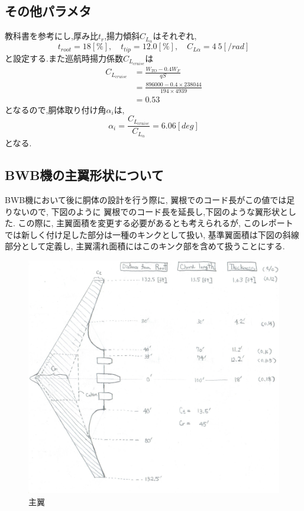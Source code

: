 \documentclass[class=article, crop=false, dvipdfmx, fleqn]{standalone}
\begin{document}
\subsection{その他パラメタ}
教科書を参考にし,厚み比$t_r$,揚力傾斜$C_{L_{\alpha}}$はそれぞれ,
\begin{equation}
  t_{root} = 18[\%] , \quad t_{tip} = 12.0[\%], \quad C_{L\alpha} = 4~5[/rad]
\end{equation}
と設定する.また巡航時揚力係数$C_{L_{cruise}}$は
\begin{align}
  C_{L_{cruise}} &= \frac{W_{TO} - 0.4W_F}{qS} \\
  &= \frac{896000 - 0.4 \times 238044}{194 \times 4939} \\
  &= 0.53
\end{align}
となるので,胴体取り付け角$\alpha_i$は,
\begin{equation}
  \alpha _i = \frac{C_{L_{cruise}}}{C_{L_{\alpha}}} = 6.06 [deg]
\end{equation}
となる.

\subsection{BWB機の主翼形状について}
BWB機において後に胴体の設計を行う際に, 翼根でのコード長がこの値では足りないので, 下図のように
翼根でのコード長を延長し,下図のような翼形状とした. この際に, 主翼面積を変更する必要があるとも考えられるが, このレポート
では新しく付け足した部分は一種のキンクとして扱い, 基準翼面積は下図の斜線部分として定義し,
主翼濡れ面積にはこのキンク部を含めて扱うことにする.
\begin{figure}[H]
  \begin{center}
  \includegraphics[width=12cm]{../images/wing.png}
  \caption{主翼}
  \label{fig::wing}
\end{center}
\end{figure}
\end{document}
